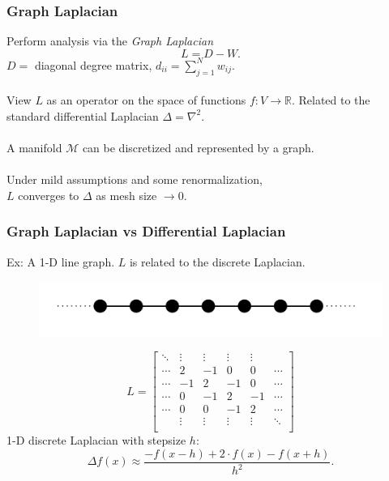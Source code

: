 \documentclass{beamer}
\begin{document}

\begin{frame}
  \frametitle{Graph Laplacian}
  Perform analysis via the \emph{Graph Laplacian}\\ \cite{Chung1997}
  \[L = D - W.\]
  $D =$ diagonal degree matrix, $d_{ii} = \sum_{j=1}^N w_{ij}$.\\~\\
  View $L$ as an operator on the space of functions $f: V\to\mathbb{R}$.
  Related to the standard differential Laplacian $\Delta = \nabla^2$. \\~\\
  A manifold $\mathcal{M}$ can be discretized and represented by a graph. \\~\\
  Under mild assumptions and some renormalization, \\
  $L$ converges to $\Delta$ as mesh size $\to 0$.
\end{frame}


\begin{frame}
  \frametitle{Graph Laplacian vs Differential Laplacian}
  Ex: A 1-D line graph. $L$ is related to the discrete Laplacian.
  \begin{figure}
    \includegraphics[width=\textwidth]{./Images/1dLaplacian/Graph.png}
  \end{figure}
  \vspace*{-5mm}
  \[L = \begin{bmatrix}
      \ddots & \vdots & \vdots & \vdots & \vdots\\
      \cdots &  2 & -1 &  0 &  0 & \cdots \\
      \cdots & -1 &  2 & -1 &  0 & \cdots \\
      \cdots &  0 & -1 &  2 & -1 & \cdots \\ 
      \cdots &  0 &  0 & -1 &  2 & \cdots \\ 
      &  \vdots & \vdots & \vdots & \vdots & \ddots \\
    \end{bmatrix}\]
  1-D discrete Laplacian with stepsize $h$:
  \[\Delta f(x) \approx \frac{-f(x-h) + 2\cdot f(x) - f(x+h)}{h^2}.\]
\end{frame}
\end{document}
